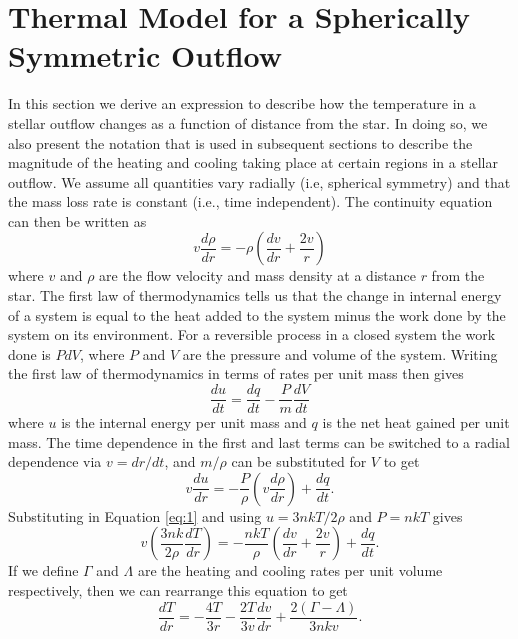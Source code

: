 \section{Thermal Model for a Spherically Symmetric Outflow}\label{sec:2}
In this section we derive an expression to describe how the temperature in a stellar outflow changes as a function of distance from the star. In doing so, we also present the notation that is used in subsequent sections to describe the magnitude of the heating and cooling taking place at certain regions in a stellar outflow. We assume all quantities vary radially (i.e, spherical symmetry) and that the mass loss rate is constant (i.e., time independent). The continuity equation can then be written as
\begin{equation}
\label{eq:1}
v\frac{d\rho}{dr}=-\rho \left(\frac{dv}{dr}+\frac{2v}{r} \right)
\end{equation}
where $v$ and $\rho$ are the flow velocity and mass density at a distance $r$ from the star. The first law of thermodynamics tells us that the change in internal energy of a system is equal to the heat added to the system minus the work done by the system on its environment. For a reversible process in a closed system the work done is $PdV$, where $P$ and $V$ are the pressure and volume of the system. Writing the first law of thermodynamics in terms of rates per unit mass then gives
\begin{equation}
\frac{du}{dt}=\frac{dq}{dt}-\frac{P}{m}\frac{dV}{dt}
\end{equation}
where $u$ is the internal energy per unit mass and $q$ is the net heat gained per unit mass. The time dependence in the first and last terms can be switched to a radial dependence via $v=dr/dt$, and $m/\rho$ can be substituted for $V$ to get
\begin{equation}
v\frac{du}{dr}=-\frac{P}{\rho}\left(v\frac{d\rho}{dr} \right)+\frac{dq}{dt}.
\end{equation}
Substituting in Equation \ref{eq:1} and using $u=3nkT/2\rho$ and $P=nkT$ gives
\begin{equation}
v\left(\frac{3nk}{2\rho}\frac{dT}{dr}\right)=-\frac{nkT}{\rho}\left(\frac{dv}{dr} + \frac{2v}{r}\right) +\frac{dq}{dt}.
\end{equation}
If we define $\Gamma$ and $\Lambda$ are the heating and cooling rates per unit volume respectively, then we can rearrange this equation to get
\begin{equation}
\frac{dT}{dr}=-\frac{4T}{3r}-\frac{2T}{3v}\frac{dv}{dr}+\frac{2(\Gamma-\Lambda)}{3nkv}.
\end{equation}
